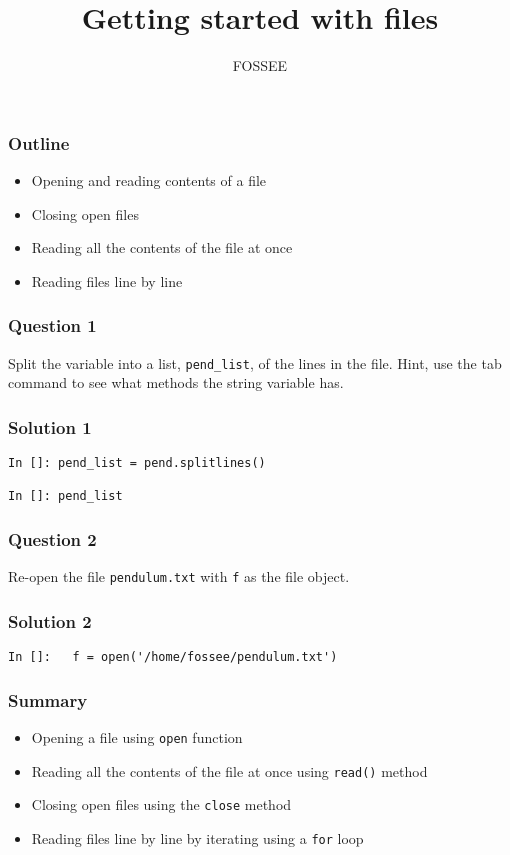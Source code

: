 \documentclass[presentation]{beamer}
\title{Getting started with files}
\author{FOSSEE}
\date{}
\begin{document}
\maketitle










\begin{frame}
\frametitle{Outline}
\label{sec-1}

\begin{itemize}
\item Opening and reading contents of a file
\item Closing open files
\item Reading all the contents of the file at once
\item Reading files line by line
\end{itemize}
\end{frame}
\begin{frame}
\frametitle{Question 1}
\label{sec-2}

  Split the variable into a list, \texttt{pend\_list}, of the lines in the
  file. Hint, use the tab command to see what methods the string
  variable has.
\end{frame}
\begin{frame}[fragile]
\frametitle{Solution 1}
\label{sec-3}

\lstset{language=Python}
\begin{lstlisting}
In []: pend_list = pend.splitlines()

In []: pend_list
\end{lstlisting}
\end{frame}
\begin{frame}
\frametitle{Question 2}
\label{sec-4}

  Re-open the file \texttt{pendulum.txt} with \texttt{f} as the file object.
\end{frame}
\begin{frame}[fragile]
\frametitle{Solution 2}
\label{sec-5}

\lstset{language=Python}
\begin{lstlisting}
In []:   f = open('/home/fossee/pendulum.txt')
\end{lstlisting}
\end{frame}
\begin{frame}
\frametitle{Summary}
\label{sec-6}

\begin{itemize}
\item Opening a file using \texttt{open} function
\item Reading all the contents of the file at once using \texttt{read()} method
\item Closing open files using the \texttt{close} method
\item Reading files line by line by iterating using a \texttt{for} loop
\end{itemize}
\end{frame}
\end{document}
